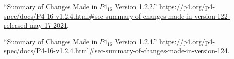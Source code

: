 \documentclass[11pt]{article}
\begin{document}
{{\begin{thebibliography}{45}
\mdbibitemlabel{{}[34]}\textquotedblleft{}Summary of Changes Made in $P4_{16}$ Version 1.2.2.\textquotedblright{} \href{https://p4.org/p4-spec/docs/P4-16-v1.2.4.html\%23sec-summary-of-changes-made-in-version-122-released-may-17-2021}{{\ttfamily https://\hspace{0pt}p4.\hspace{0pt}org/\hspace{0pt}p4-\hspace{0pt}spec/\hspace{0pt}docs/\hspace{0pt}P4-\hspace{0pt}16-\hspace{0pt}v1.\hspace{0pt}2.\hspace{0pt}4.\hspace{0pt}html\#\hspace{0pt}sec-\hspace{0pt}summary-\hspace{0pt}of-\hspace{0pt}changes-\hspace{0pt}made-\hspace{0pt}in-\hspace{0pt}version-\hspace{0pt}122-\hspace{0pt}released-\hspace{0pt}may-\hspace{0pt}17-\hspace{0pt}2021}}.\label{p4revisions122}%

\mdbibitemlabel{{}[35]}\textquotedblleft{}Summary of Changes Made in $P4_{16}$ Version 1.2.4.\textquotedblright{} \href{https://p4.org/p4-spec/docs/P4-16-v1.2.4.html\%23sec-summary-of-changes-made-in-version-124}{{\ttfamily https://\hspace{0pt}p4.\hspace{0pt}org/\hspace{0pt}p4-\hspace{0pt}spec/\hspace{0pt}docs/\hspace{0pt}P4-\hspace{0pt}16-\hspace{0pt}v1.\hspace{0pt}2.\hspace{0pt}4.\hspace{0pt}html\#\hspace{0pt}sec-\hspace{0pt}summary-\hspace{0pt}of-\hspace{0pt}changes-\hspace{0pt}made-\hspace{0pt}in-\hspace{0pt}version-\hspace{0pt}124}}.\label{p4revisions124}%


\end{thebibliography}}}
\end{document}
